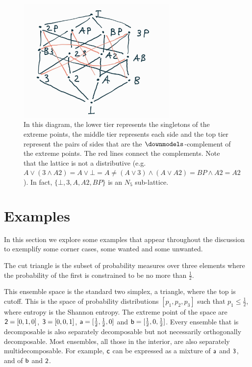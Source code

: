 \begin{figure}[h]
	\centering
	\includegraphics[width=0.7\textwidth]{tempimages/CutTriangleSubspaces2.jpg}
	\caption{In this diagram, the lower tier represents the singletons of the extreme points, the middle tier represents each side and the top tier represent the pairs of sides that are the $\separate$-complement of the extreme points. The red lines connect the complements. Note that the lattice is not a distributive (e.g. $A\vee (3 \wedge A2) = A \vee \bot = A \neq (A\vee 3) \wedge (A \vee A2) = BP \wedge A2 = A2$). In fact, $\{\bot, 3, A, A2, BP\}$ is an $N_5$ sub-lattice. }
\end{figure}



\section{Examples}

In this section we explore some examples that appear throughout the discussion to exemplify some corner cases, some wanted and some unwanted.

\begin{example}\label{pm_es_cutTriangle}
	The cut triangle is the subset of probability measures over three elements where the probability of the first is constrained to be no more than $\frac{1}{2}$.
\end{example}

This ensemble space is the standard two simplex, a triangle, where the top is cutoff. This is the space of probability distributions $[p_1, p_2, p_3]$ such that $p_1 \leq \frac{1}{2}$, where entropy is the Shannon entropy. The extreme point of the space are $\ens[2] = [0,1,0]$, $\ens[3] = [0,0,1]$, $\ens[a] = [\frac{1}{2},\frac{1}{2},0]$ and $\ens[b] = [\frac{1}{2},0,\frac{1}{2}]$. Every ensemble that is decomposable is also separately decomposable but not necessarily orthogonally decomposable. Most ensembles, all those in the interior, are also separately multidecomposable. For example, $\ens[c]$ can be expressed as a mixture of $\ens[a]$ and $\ens[3]$, and of $\ens[b]$ and $\ens[2]$.

